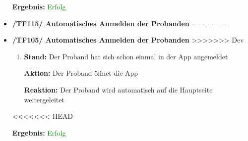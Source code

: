 \documentclass[a4paper]{scrreprt}
\begin{document}
\begin{itemize}
                               \vspace*{0.3cm}
		      		           \par \textbf{Ergebnis: }\textcolor{green}{Erfolg}
		      		           \vspace*{0.6cm}

                  \item \textbf{/TF115/ Automatisches Anmelden der Probanden}
=======
                  \item \textbf{/TF105/ Automatisches Anmelden der Probanden}
>>>>>>> Dev
	              \begin{enumerate}
	        	        \item \par \textbf{Stand: }Der Proband hat sich schon einmal in der App angemeldet
	        	        \par \textbf{Aktion: }Der Proband öffnet die App
	        	        \par \textbf{Reaktion: }Der Proband wird automatisch auf die Hauptseite weitergeleitet
	              \end{enumerate}
<<<<<<< HEAD
                               \vspace*{0.3cm}
		      		           \par \textbf{Ergebnis: }\textcolor{green}{Erfolg}
		      		           \vspace*{0.6cm}


\end{itemize}
\end{document}

